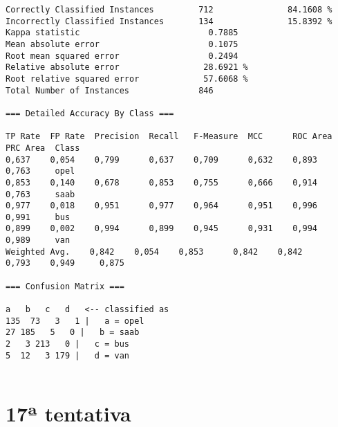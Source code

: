 \documentclass[
	article,			%
	11pt,				%
	oneside,			%
	a4paper,			%
	english,			%
	brazil,				%
	sumario=tradicional
	]{abntex2}
\begin{document}
\begin{lstlisting}
Correctly Classified Instances         712               84.1608 %
Incorrectly Classified Instances       134               15.8392 %
Kappa statistic                          0.7885
Mean absolute error                      0.1075
Root mean squared error                  0.2494
Relative absolute error                 28.6921 %
Root relative squared error             57.6068 %
Total Number of Instances              846     

=== Detailed Accuracy By Class ===

TP Rate  FP Rate  Precision  Recall   F-Measure  MCC      ROC Area  PRC Area  Class
0,637    0,054    0,799      0,637    0,709      0,632    0,893     0,763     opel
0,853    0,140    0,678      0,853    0,755      0,666    0,914     0,763     saab
0,977    0,018    0,951      0,977    0,964      0,951    0,996     0,991     bus
0,899    0,002    0,994      0,899    0,945      0,931    0,994     0,989     van
Weighted Avg.    0,842    0,054    0,853      0,842    0,842      0,793    0,949     0,875     

=== Confusion Matrix ===

a   b   c   d   <-- classified as
135  73   3   1 |   a = opel
27 185   5   0 |   b = saab
2   3 213   0 |   c = bus
5  12   3 179 |   d = van


\end{lstlisting}

\section{17ª tentativa}
\end{document}
